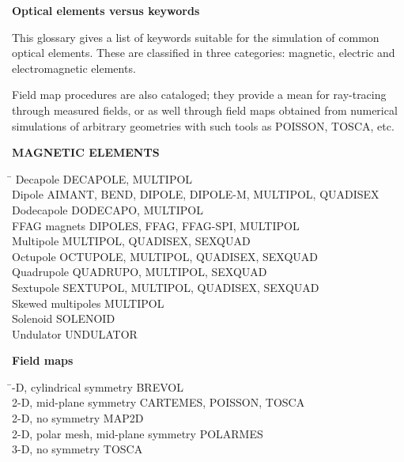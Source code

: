 
\centerline{\LARGE\textbf{Optical elements versus keywords}}
\bigskip


This glossary gives a list of keywords suitable for the 
simulation of  common optical elements. These are classified in 
three categories: magnetic, electric and electromagnetic elements.

Field map procedures are also cataloged; they provide a mean for ray-tracing through 
measured fields, or as well through field maps obtained from numerical simulations of 
arbitrary geometries with such tools as POISSON, TOSCA, etc.

\bigskip


\noindent\textbf{MAGNETIC ELEMENTS} 
\smallskip

\begin{tabbing}
\hspace*{7cm} \= \kill
  Decapole          \> DECAPOLE, MULTIPOL \\
  Dipole            \> AIMANT, BEND, DIPOLE, DIPOLE-M, MULTIPOL, QUADISEX \\
  Dodecapole        \> DODECAPO, MULTIPOL \\
  FFAG magnets      \> DIPOLES, FFAG, FFAG-SPI, MULTIPOL \\
  Multipole         \> MULTIPOL, QUADISEX, SEXQUAD \\
  Octupole          \> OCTUPOLE, MULTIPOL, QUADISEX, SEXQUAD \\
  Quadrupole        \> QUADRUPO, MULTIPOL, SEXQUAD \\
  Sextupole         \> SEXTUPOL, MULTIPOL, QUADISEX, SEXQUAD \\
  Skewed multipoles \> MULTIPOL \\
  Solenoid          \> SOLENOID  \\
  Undulator         \> UNDULATOR 
\end{tabbing}
\bigskip

\noindent\textbf{Field maps}  
\smallskip

\begin{tabbing}
\hspace*{7cm} \= -D, cylindrical symmetry \> BREVOL \\
  2-D, mid-plane symmetry   \> CARTEMES, POISSON, TOSCA \\
  2-D, no symmetry          \> MAP2D \\
  2-D, polar mesh, mid-plane symmetry          \> POLARMES \\
  3-D, no symmetry          \> TOSCA
\end{tabbing}
\bigskip

